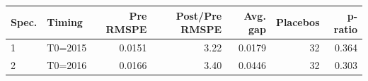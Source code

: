 \begin{tabular}{llrrrrr}
\hline
Spec. & Timing & Pre RMSPE & Post/Pre RMSPE & Avg. gap & Placebos & p-ratio \\
\hline
1 & T0=2015 & 0.0151 & 3.22 & 0.0179 & 32 & 0.364 \\
2 & T0=2016 & 0.0166 & 3.40 & 0.0446 & 32 & 0.303 \\
\hline
\end{tabular}
